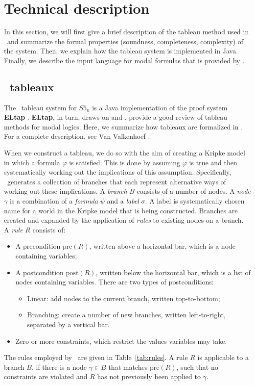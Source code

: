 \section{Technical description}
\label{sec:technical}

In this section, we will first give a brief description of the tableau method
used in \oops\ and summarize the formal properties (soundness, completeness,
complexity) of the system. Then, we explain how the
tableau system is implemented in Java. Finally, we describe the input language
for modal formulas that is provided by \oops.

\subsection{\oops\ tableaux}
\label{sec:}

The \oops\ tableau system for $S5_n$ is a Java \citep{gosling2005}
implementation of the proof system {\bf ELtap} \citep{deboer2006}.  {\bf
ELtap}, in turn, draws on \citet{fitting1999} and \citet{beckert1997}.
\citet{halpern1992} provide a good review of tableau methods for modal logics.
Here, we summarize how tableaux are formalized in \oops. For a complete
description, see Van Valkenhoef \citep{valkenhoef2008}.

When we construct a tableau, we do so with the aim of creating a Kripke model
in which a formula $\varphi$ is satisfied. This is done by assuming $\varphi$
is true and then systematically working out the implications of this
assumption. Specifically, \oops\ generates a collection of branches that each
represent alternative ways of working out these implications. A {\em branch}
$B$ consists of a number of nodes. A {\em node} $\gamma$ is a combination of a
{\em formula} $\psi$ and a {\em label} $\sigma$. A label is systematically
chosen name for a world in the Kripke model that is being constructed. Branches
are created and expanded by the application of {\em rules} to existing nodes on
a branch. A {\em rule} $R$ consists of:

\begin{itemize}
\item A precondition $\mathrm{pre}(R)$, written above a horizontal bar, which
is a node containing variables;
\item A postcondition $\mathrm{post}(R)$, written below the horizontal bar,
which is a list of nodes containing variables. There are two types of
postconditions:
\begin{itemize}
\item Linear: add nodes to the current branch, written top-to-bottom;
\item Branching: create a number of new branches, written left-to-right, separated by a vertical bar.
\end{itemize}
\item Zero or more constraints, which restrict the values variables may take.
\end{itemize}
The rules employed by \oops\ are given in Table~\ref{tab:rules}. A rule $R$ is
applicable to a branch $B$, if there is a node $\gamma \in B$ that matches
$\mathrm{pre}(R)$, such that no constraints are violated and $R$ has not
previously been applied to $\gamma$.

